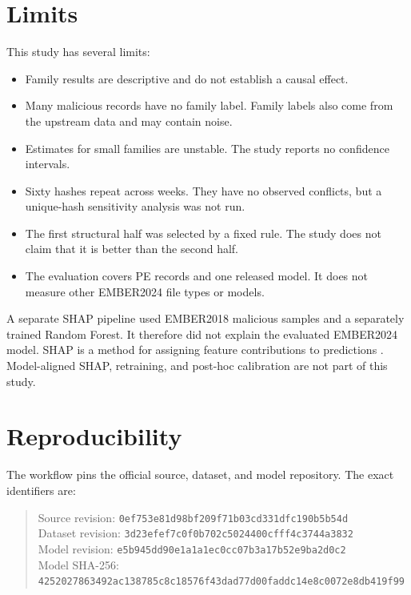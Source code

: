 \documentclass[11pt]{article}
\newcommand{\code}[1]{\texttt{#1}}
\begin{document}
\section{Limits}

This study has several limits:

\begin{itemize}
  \item Family results are descriptive and do not establish a causal effect.
  \item Many malicious records have no family label. Family labels also come
  from the upstream data and may contain noise.
  \item Estimates for small families are unstable. The study reports no
  confidence intervals.
  \item Sixty hashes repeat across weeks. They have no observed conflicts, but
  a unique-hash sensitivity analysis was not run.
  \item The first structural half was selected by a fixed rule. The study does
  not claim that it is better than the second half.
  \item The evaluation covers PE records and one released model. It does not
  measure other EMBER2024 file types or models.
\end{itemize}

A separate SHAP pipeline used EMBER2018 malicious samples and a separately
trained Random Forest. It therefore did not explain the evaluated EMBER2024
model. SHAP is a method for assigning feature contributions to predictions
\cite{lundberg2017shap}. Model-aligned SHAP, retraining, and post-hoc calibration
are not part of this study.

\section{Reproducibility}

The workflow pins the official source, dataset, and model repository. The exact
identifiers are:

\begin{quote}
\small
Source revision: \code{0ef753e81d98bf209f71b03cd331dfc190b5b54d}\\
Dataset revision: \code{3d23efef7c0f0b702c5024400cfff4c3744a3832}\\
Model revision: \code{e5b945dd90e1a1a1ec0cc07b3a17b52e9ba2d0c2}\\
Model SHA-256: \code{4252027863492ac138785c8c18576f43dad77d00faddc14e8c0072e8db419f99}
\end{quote}
\end{document}
